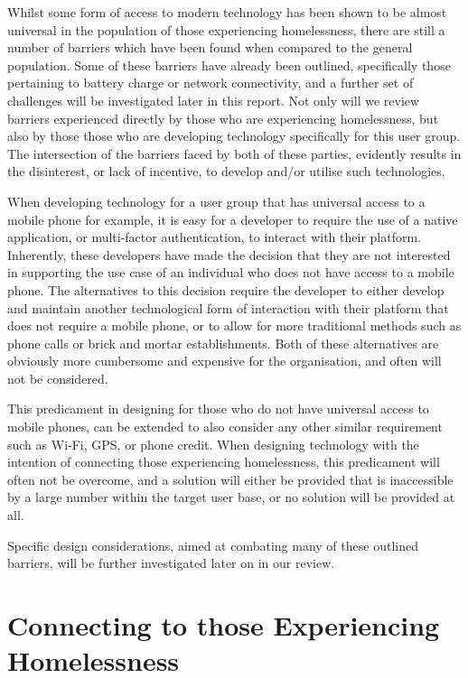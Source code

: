 Whilst some form of access to modern technology has been shown to be almost universal in the population of those experiencing homelessness, there are still a number of barriers which have been found when compared to the general population. Some of these barriers have already been outlined, specifically those pertaining to battery charge or network connectivity, and a further set of challenges will be investigated later in this report. Not only will we review barriers experienced directly by those who are experiencing homelessness, but also by those those who are developing technology specifically for this user group. The intersection of the barriers faced by both of these parties, evidently results in the disinterest, or lack of incentive, to develop and/or utilise such technologies.

When developing technology for a user group that has universal access to a mobile phone for example, it is easy for a developer to require the use of a native application, or multi-factor authentication, to interact with their platform. Inherently, these developers have made the decision that they are not interested in supporting the use case of an individual who does not have access to a mobile phone. The alternatives to this decision require the developer to either develop and maintain another technological form of interaction with their platform that does not require a mobile phone, or to allow for more traditional methods such as phone calls or brick and mortar establishments. Both of these alternatives are obviously more cumbersome and expensive for the organisation, and often will not be considered.

This predicament in designing for those who do not have universal access to mobile phones, can be extended to also consider any other similar requirement such as Wi-Fi, GPS, or phone credit. When designing technology with the intention of connecting those experiencing homelessness, this predicament will often not be overcome, and a solution will either be provided that is inaccessible by a large number within the target user base, or no solution will be provided at all.

Specific design considerations, aimed at combating many of these outlined barriers, will be further investigated later on in our review.

\section{Connecting to those Experiencing Homelessness}

